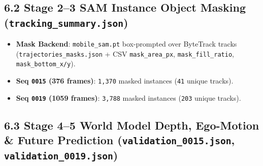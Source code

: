 \documentclass[10.5pt,a4paper]{article}
\begin{document}
\subsection{6.2 Stage 2--3 SAM Instance Object Masking (\texttt{tracking\_\allowbreak{}summary.\allowbreak{}json})}
\begin{itemize}[leftmargin=1.5em,itemsep=2pt]
\item \textbf{Mask Backend}: \texttt{mobile\_\allowbreak{}sam.\allowbreak{}pt} box-prompted over ByteTrack tracks (\texttt{trajectories\_\allowbreak{}masks.\allowbreak{}json} + CSV \texttt{mask\_\allowbreak{}area\_\allowbreak{}px}, \texttt{mask\_\allowbreak{}fill\_\allowbreak{}ratio}, \texttt{mask\_\allowbreak{}bottom\_\allowbreak{}x/\allowbreak{}y}).
\item \textbf{Seq \texttt{0015} (376 frames)}: \texttt{1,\allowbreak{}370} masked instances (\texttt{41} unique tracks).
\item \textbf{Seq \texttt{0019} (1059 frames)}: \texttt{3,\allowbreak{}788} masked instances (\texttt{203} unique tracks).
\end{itemize}

\subsection{6.3 Stage 4--5 World Model Depth, Ego-Motion \& Future Prediction (\texttt{validation\_\allowbreak{}0015.\allowbreak{}json}, \texttt{validation\_\allowbreak{}0019.\allowbreak{}json})}
\end{document}
